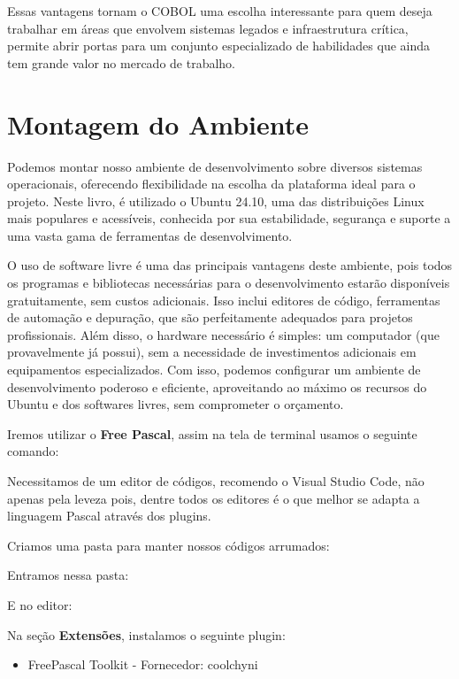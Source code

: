 Essas vantagens tornam o COBOL uma escolha interessante para quem deseja trabalhar em áreas que envolvem sistemas legados e infraestrutura crítica, permite abrir portas para um conjunto especializado de habilidades que ainda tem grande valor no mercado de trabalho.

\section{Montagem do Ambiente}
Podemos montar nosso ambiente de desenvolvimento sobre diversos sistemas operacionais, oferecendo flexibilidade na escolha da plataforma ideal para o projeto. Neste livro, é utilizado o Ubuntu 24.10, uma das distribuições Linux mais populares e acessíveis, conhecida por sua estabilidade, segurança e suporte a uma vasta gama de ferramentas de desenvolvimento.

O uso de software livre é uma das principais vantagens deste ambiente, pois todos os programas e bibliotecas necessárias para o desenvolvimento estarão disponíveis gratuitamente, sem custos adicionais. Isso inclui editores de código, ferramentas de automação e depuração, que são perfeitamente adequados para projetos profissionais. Além disso, o hardware necessário é simples: um computador (que provavelmente já possui), sem a necessidade de investimentos adicionais em equipamentos especializados. Com isso, podemos configurar um ambiente de desenvolvimento poderoso e eficiente, aproveitando ao máximo os recursos do Ubuntu e dos softwares livres, sem comprometer o orçamento.

Iremos utilizar o \textbf{Free Pascal}, assim na tela de terminal usamos o seguinte comando: \\

Necessitamos de um editor de códigos, recomendo o Visual Studio Code, não apenas pela leveza pois, dentre todos os editores é o que melhor se adapta a linguagem Pascal através dos plugins. \\

Criamos uma pasta para manter nossos códigos arrumados: \\

Entramos nessa pasta: \\

E no editor: \\

Na seção \textbf{Extensões}, instalamos o seguinte plugin:
\begin{itemize}
	\item FreePascal Toolkit - Fornecedor: coolchyni
\end{itemize}


